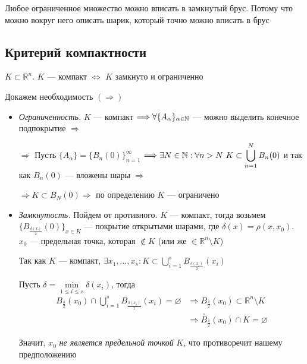 \comment Любое ограниченное множество можно вписать в замкнутый брус. Потому что можно вокруг него описать шарик, который точно можно вписать в брус

\subsection{Критерий компактности}
\theorem $K\subset \mathbb{R}^n$. $K$ — компакт $\Longleftrightarrow$ $K$ замкнуто и ограниченно

\proof Докажем необходимость $(\Longrightarrow)$
\begin{itemize}
    \item \textit{Ограниченность.} $K$ — компакт $\Longrightarrow \forall \{A_\alpha\}_{\alpha\in\operatorname{\mathbb{N}}}$ — можно выделить конечное подпокрытие $\Longrightarrow$

    $\Longrightarrow$ Пусть $\{A_\alpha\}=\{B_n(0)\}_{n=1}^\infty$ $\Longrightarrow \exists N \in \operatorname{\mathbb{N}} : \forall n > N ~ K \subset \displaystyle\bigcup_{n=1}^N B_n(0)$ и так как $B_n(0)$ — вложены шары $\Longrightarrow$

    $\Longrightarrow K \subset B_N(0) \Longrightarrow$ по определению $K$ — ограничено

    \begin{center}
       
    \end{center}


    \item \textit{Замкнутость.} Пойдем от противного. $K$ — компакт, тогда возьмем $\{B_{\frac{\delta(x)}{2}}(0)\}_{x\in K}$ — покрытие открытыми шарами, где $\delta(x)=\rho(x,x_0)$. $x_0$ — предельная точка, которая $\notin K$ (или же $\in \mathbb{R}^n\setminus K$)

    Так как $K$ — компакт, $\exists x_1,\ldots, x_s:K\subset\displaystyle\bigcup_{i=1}^{s} B_{\frac{\delta(x_i)}{2}}(x_i)$

    Пусть $\delta=\min\limits_{1\leqslant i\leqslant s}{\delta(x_i)}$, тогда
    \begin{equation*}
        \begin{aligned}
            B_{\frac{\delta}{2}}(x_0)\cap\bigcup_{i=1}^{s}B_{\frac{\delta(x_i)}{2}}(x_i)=\varnothing&\Longrightarrow B_{\frac{\delta}{2}}(x_0)\subset\mathbb{R}^n\setminus K\\
            &\Longrightarrow\stackrel{\circ}{B}_{\frac{\delta}{2}}(x_0)\cap K=\varnothing
        \end{aligned}
    \end{equation*}

    Значит, $x_0$ \textit{не является предельной точкой} $K$, что противоречит нашему предположению

    \begin{center}
        
    \end{center}


\end{itemize}

